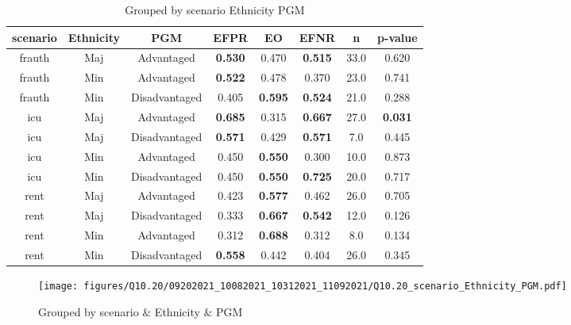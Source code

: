 \begin{table}[h]
    \centering
    \begin{tabular}{|c|c|c|c|c|c|c|c|}
        \hline
        scenario & Ethnicity & PGM & EFPR & EO & EFNR & n & p-value\\
        \hline
        frauth & Maj & Advantaged & \textbf{0.530} & 0.470 & \textbf{0.515} & 33.0 & 0.620\\
		frauth & Min & Advantaged & \textbf{0.522} & 0.478 & 0.370 & 23.0 & 0.741\\
		frauth & Min & Disadvantaged & 0.405 & \textbf{0.595} & \textbf{0.524} & 21.0 & 0.288\\
		icu & Maj & Advantaged & \textbf{0.685} & 0.315 & \textbf{0.667} & 27.0 & \textbf{0.031}\\
		icu & Maj & Disadvantaged & \textbf{0.571} & 0.429 & \textbf{0.571} & 7.0 & 0.445\\
		icu & Min & Advantaged & 0.450 & \textbf{0.550} & 0.300 & 10.0 & 0.873\\
		icu & Min & Disadvantaged & 0.450 & \textbf{0.550} & \textbf{0.725} & 20.0 & 0.717\\
		rent & Maj & Advantaged & 0.423 & \textbf{0.577} & 0.462 & 26.0 & 0.705\\
		rent & Maj & Disadvantaged & 0.333 & \textbf{0.667} & \textbf{0.542} & 12.0 & 0.126\\
		rent & Min & Advantaged & 0.312 & \textbf{0.688} & 0.312 & 8.0 & 0.134\\
		rent & Min & Disadvantaged & \textbf{0.558} & 0.442 & 0.404 & 26.0 & 0.345\\
		
        \hline
    \end{tabular}
    \caption{Grouped by scenario Ethnicity PGM}
    \label{tab:my_label}
\end{table}
\begin{figure}[h]
    \centering
    \texttt{[image: figures/Q10.20/09202021\_10082021\_10312021\_11092021/Q10.20\_scenario\_Ethnicity\_PGM.pdf]}
    \caption{Grouped by scenario \& Ethnicity \& PGM}
    \label{fig:my_label}
\end{figure}
